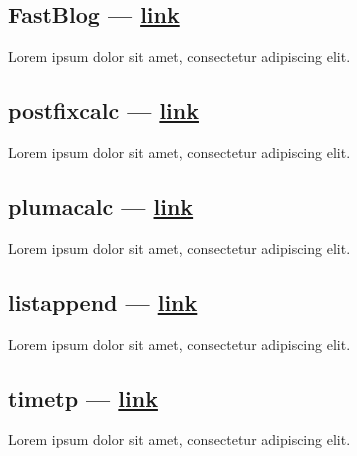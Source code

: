 \subsection{{FastBlog --- \href{https://github.com/mahdihaghverdi/FastBlog/}{link}}}
\begin{zitemize}
\item Lorem ipsum dolor sit amet, consectetur adipiscing elit.
\end{zitemize}

\subsection{{postfixcalc --- \href{https://github.com/mahdihaghverdi/postfixcalc}{link}}}
\begin{zitemize}
\item Lorem ipsum dolor sit amet, consectetur adipiscing elit.
\end{zitemize}

\subsection{{plumacalc --- \href{https://github.com/mahdihaghverdi/plumacalc}{link}}}
\begin{zitemize}
\item Lorem ipsum dolor sit amet, consectetur adipiscing elit.
\end{zitemize}

\subsection{{listappend --- \href{https://github.com/mahdihaghverdi/listappend}{link}}}
\begin{zitemize}
\item Lorem ipsum dolor sit amet, consectetur adipiscing elit.
\end{zitemize}

\subsection{{timetp --- \href{https://github.com/mahdihaghverdi/timetp}{link}}}
\begin{zitemize}
\item Lorem ipsum dolor sit amet, consectetur adipiscing elit.
\end{zitemize}

